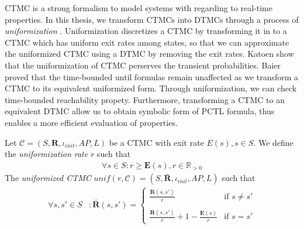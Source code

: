 CTMC is a strong formalism to model systems with regarding to real-time properties. In this thesis,
we transform CTMCs into DTMCs through a process of \textit{uniformization} \cite{katoen2001faster}.
Uniformization discretizes a CTMC by transforming it in to a CTMC which has uniform exit rates among
states, so that we can approximate the uniformized CTMC using a DTMC by removing the exit rates.
Katoen \cite{katoen2001faster} show that the uniformization of CTMC perserves the transient
probabilities. Baier \cite{baier2002simulation} proved that the time-bounded until formulas remain
unaffected as we transform a CTMC to its equivalent uniformized form. Through uniformization, we can
check time-bounded reachability propety. Furthermore, transforming a CTMC to an equivalent DTMC
allow us to obtain symbolic form of PCTL formula, thus enables a more efficient evaluation of
properties.

\begin{definition}
      \rm
      Let $\mathcal{C} = (S,\mathbf{R}, \iota_{init}, AP, L)$ be a CTMC with exit rate $E(s), s\in S$. We
      define the \textit{uniformization rate} $r$ such that
      \begin{align*}
            \forall s\in S: r \geq \mathbf{E}(s), r\in\mathbb{R}_{>0}
      \end{align*}
      The \textit{uniformized CTMC} $unif(r, \mathcal{C})=(S, \bar{\mathbf{R}}, \iota_{init}, AP, L )$ such that
      \begin{align*}
            \forall s, s'\in S & : \bar{\mathbf{R}}(s,s')=
            \begin{cases}
                  \frac{\mathbf{R}(s,s')}{r}                               & \text{if $s \neq s'$} \\ \quad \\
                  \frac{\mathbf{R}(s,s')}{r} + 1 - \frac{\mathbf{E}(s)}{r} & \text{if $s = s'$}
            \end{cases}
      \end{align*}
\end{definition}

